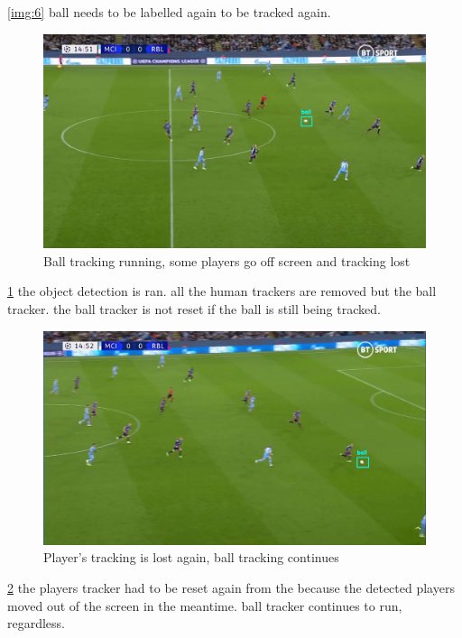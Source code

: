 \documentclass[
11pt,
twoside
]{report}
\begin{document}
\ref{img:6} ball needs
to be labelled again to be tracked again.
\begin{figure}[H]
    \includegraphics[keepaspectratio, width=\columnwidth]{Screenshot_2022-03-03_23-05-49.png}
    \caption{Ball tracking running, some players go off screen and tracking lost}
    \label{img:7}
\end{figure}
\ref{img:7} the object
detection is ran. all the human trackers are removed but the ball tracker. the ball tracker is not reset if the ball is still being tracked.
\begin{figure}[H]
    \includegraphics[keepaspectratio, width=\columnwidth]{Screenshot_2022-03-03_23-06-03.png}
    \caption{Player's tracking is lost again, ball tracking continues}
    \label{img:8}
\end{figure}
\ref{img:8} the
players tracker had to be reset again from the because the detected players moved out of the screen in the meantime. ball tracker continues to run, regardless.
\end{document}
